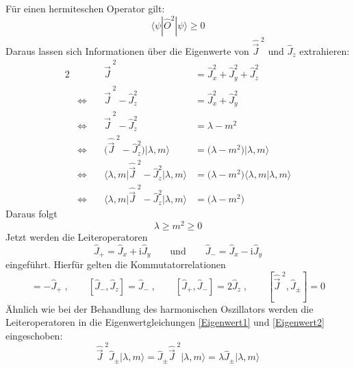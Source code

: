 \documentclass[9pt]{report}
\begin{document}
Für einen hermiteschen Operator gilt:
\begin{equation}
\langle\psi|\hat{O}^{2}|\psi\rangle\geq 0
\end{equation}
Daraus lassen sich Informationen über die Eigenwerte von $\hat{\vec{J}}^{\;2}$ und $\hat{J}_z$ extrahieren:
\begin{alignat*}{2}
&\qquad           & \hat{\vec{J}}^{\;2} &= \hat{J}_{x}^{2}+\hat{J}_{y}^{2}+\hat{J}_{z}^{2}         \\
&\Leftrightarrow     &  \hat{\vec{J}}^{\;2}-\hat{J}_{z}^{2}     &= \hat{J}_{x}^{2}+\hat{J}_{y}^{2}        \\
&\Leftrightarrow  & \hat{\vec{J}}^{\;2}-\hat{J}_{z}^{2} &=          \lambda -m^2\\
&\Leftrightarrow  & \big(\hat{\vec{J}}^{\;2}-\hat{J}_{z}^{2}\big)\big|\lambda,m\big\rangle &= \big(\lambda-m^2\big)\big|\lambda,m\big\rangle         \\
&\Leftrightarrow     &  \big\langle\lambda,m\big|\hat{\vec{J}}^{\;2}-\hat{J}_{z}^{2}\big|\lambda,m\big\rangle     &=  \big(\lambda-m^2\big)\langle\lambda,m|\lambda,m\rangle \\
&\Leftrightarrow     &  \big\langle\lambda,m\big|\hat{\vec{J}}^{\;2}-\hat{J}_{z}^{2}\big|\lambda,m\big\rangle    &=    \big(\lambda-m^2\big)
\end{alignat*}
Daraus folgt
\begin{equation}
\lambda\geq m^2\geq 0\label{Abbruchbedingung}
\end{equation}
Jetzt werden die Leiteroperatoren
\begin{equation}
\hat{J}_{+}=\hat{J}_{x}+\mathrm{i}\hat{J}_{y}\qquad\mathrm{und}\qquad\hat{J}_{-}=\hat{J}_{x}-\mathrm{i}\hat{J}_{y}
\end{equation}
eingeführt. Hierfür gelten die Kommutatorrelationen
\begin{equation}
[\hat{J}_{+},\hat{J}_{z}]=-\hat{J}_{+}\;,\qquad [\hat{J}_{-},\hat{J}_{z}]=\hat{J}_{-}\;,\qquad [\hat{J}_{+},\hat{J}_{-}]=2\hat{J}_{z}\;,\qquad [\hat{\vec{J}}^{\;2},\hat{J}_{\pm}]=0
\end{equation}
Ähnlich wie bei der Behandlung des harmonischen Oszillators werden die Leiteroperatoren in die Eigenwertgleichungen \eqref{Eigenwert1} und \eqref{Eigenwert2} eingeschoben:
\begin{equation}
\hat{\vec{J}}^{\;2}\hat{J}_{\pm}\big|\lambda,m\big\rangle = \hat{J}_{\pm}\hat{\vec{J}}^{\;2}\big|\lambda,m\big\rangle = \lambda\hat{J}_{\pm}\big|\lambda,m\big\rangle
\end{equation}
\end{document}
